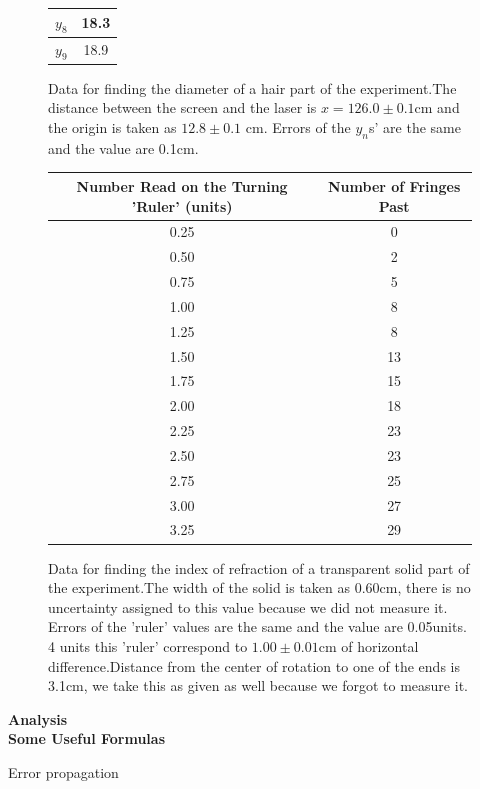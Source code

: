 \documentclass[10pt,a4paper]{article}
\begin{document}
{\begin{center}
\begin{figure} [H]
\begin{tabular}{|c |c|}
			\hline	
			$y_{8}$ & 18.3\\
			\hline
			$y_{9}$&18.9\\
			\hline		
		\end{tabular}
		\caption{Data for finding the diameter of a hair part of the experiment.The distance between the screen and the laser is $x=126.0\pm0.1$cm and the origin is taken as $12.8\pm0.1$ cm. Errors of the $y_n$s' are the same and the value are 0.1cm.}
	\end{figure}
\end{center}
\begin{center}
	\begin{figure} [H] 
		\begin{tabular}{|c |c|} \hline
			Number Read on the Turning 'Ruler' (units)& Number of Fringes Past \\ [0.5ex] 
			\hline
			0.25&0 \\
			\hline
			0.50 & 2\\
			\hline 
			0.75 &5\\
			\hline 
			1.00&8 \\
			\hline 
			1.25 &8 \\
			\hline 
			1.50 &13\\
			\hline 
			1.75 & 15\\
			\hline
			2.00&18\\
			\hline
			2.25&23 \\
			\hline
			2.50 &23\\
			\hline 
			2.75 &25\\
			\hline 
			3.00&27\\
			\hline 
			3.25 & 29\\
			\hline 	
		\end{tabular}
		\caption{Data for finding the index of refraction of a transparent solid part of the experiment.The width of the solid is taken as 0.60cm, there is no uncertainty assigned to this value because we did not measure it. Errors of the 'ruler' values are the same and the value are 0.05units. 4 units this 'ruler' correspond to $1.00\pm0.01$cm of horizontal difference.Distance from the center of rotation to one of the ends is 3.1cm, we take this as given as well because we forgot to measure it.}
	\end{figure}
\end{center}
\textbf{Analysis}\\[\baselineskip]
\textbf{\small{Some Useful Formulas}}
\par Error propagation
\begin{equation}

\end{equation}}
\end{document}
